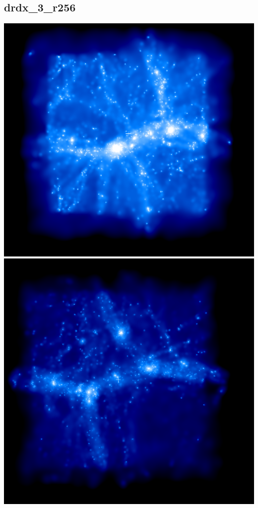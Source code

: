 % 
%
%
%
%
%
%
%


\newpage
\subsection{drdx\_3\_r256}

\includegraphics[scale=0.2]{drdx_3_r256/1.png} 
\includegraphics[scale=0.2]{drdx_3_r256/2.png} \\
